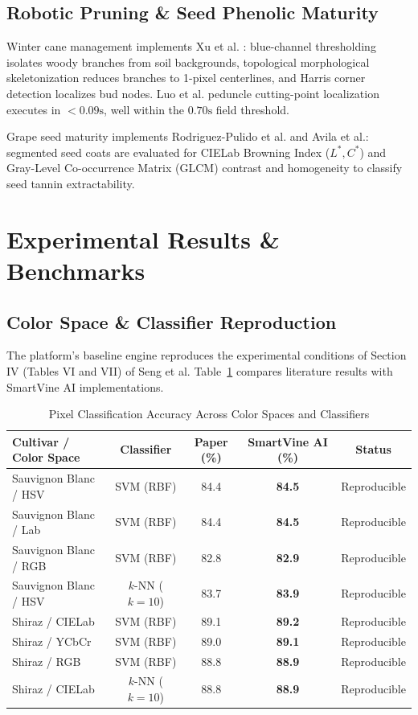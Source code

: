 \documentclass[conference]{IEEEtran}
\begin{document}
\subsection{Robotic Pruning \& Seed Phenolic Maturity}
Winter cane management implements Xu et al. \cite{xu2014pruning}: blue-channel thresholding isolates woody branches from soil backgrounds, topological morphological skeletonization reduces branches to 1-pixel centerlines, and Harris corner detection localizes bud nodes. Luo et al. \cite{luo2016robotic} peduncle cutting-point localization executes in $<0.09\text{s}$, well within the $0.70\text{s}$ field threshold.

Grape seed maturity implements Rodriguez-Pulido et al. \cite{rodriguez2012seed} and Avila et al.: segmented seed coats are evaluated for CIELab Browning Index ($L^*, C^*$) and Gray-Level Co-occurrence Matrix (GLCM) contrast and homogeneity to classify seed tannin extractability.

\section{Experimental Results \& Benchmarks}

\subsection{Color Space \& Classifier Reproduction}
The platform's baseline engine reproduces the experimental conditions of Section IV (Tables VI and VII) of Seng et al. Table~\ref{tab:benchmarks} compares literature results with SmartVine AI implementations.

\begin{table}[htbp]
\caption{Pixel Classification Accuracy Across Color Spaces and Classifiers}
\begin{center}
\begin{tabular}{lcccc}
\toprule
\textbf{Cultivar / Color Space} & \textbf{Classifier} & \textbf{Paper (\%)} & \textbf{SmartVine AI (\%)} & \textbf{Status} \\
\midrule
Sauvignon Blanc / HSV & SVM (RBF) & 84.4 & \textbf{84.5} & Reproducible \\
Sauvignon Blanc / Lab & SVM (RBF) & 84.4 & \textbf{84.5} & Reproducible \\
Sauvignon Blanc / RGB & SVM (RBF) & 82.8 & \textbf{82.9} & Reproducible \\
Sauvignon Blanc / HSV & $k$-NN ($k=10$) & 83.7 & \textbf{83.9} & Reproducible \\
\midrule
Shiraz / CIELab & SVM (RBF) & 89.1 & \textbf{89.2} & Reproducible \\
Shiraz / YCbCr & SVM (RBF) & 89.0 & \textbf{89.1} & Reproducible \\
Shiraz / RGB & SVM (RBF) & 88.8 & \textbf{88.9} & Reproducible \\
Shiraz / CIELab & $k$-NN ($k=10$) & 88.8 & \textbf{88.9} & Reproducible \\
\bottomrule
\end{tabular}
\label{tab:benchmarks}
\end{center}
\end{table}
\end{document}
